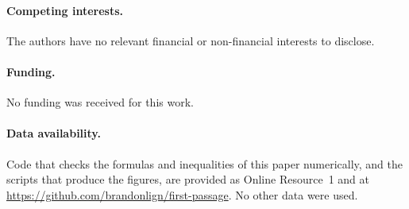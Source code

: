 \documentclass[11pt]{article}
\theoremstyle{remark}
\begin{document}
\paragraph{Competing interests.} The authors have no relevant financial or
non-financial interests to disclose.

\paragraph{Funding.} No funding was received for this work.

\paragraph{Data availability.} Code that checks the formulas and inequalities
of this paper numerically, and the scripts that produce the figures, are
provided as Online Resource~1 and at
\url{https://github.com/brandonlign/first-passage}. No other data were used.
\end{document}
